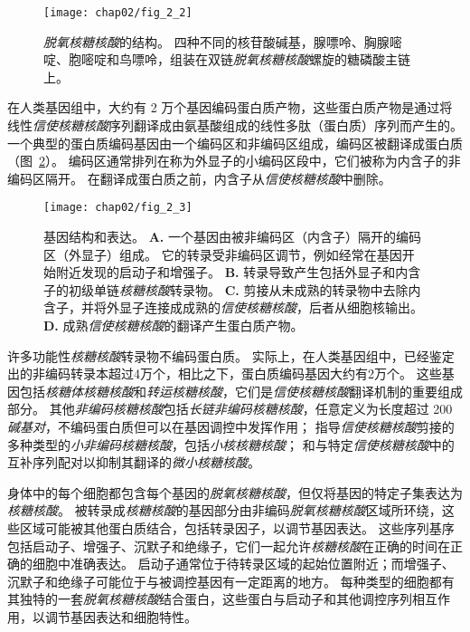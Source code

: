 \begin{figure}[htbp]
	\centering
	\texttt{[image: chap02/fig\_2\_2]}
	\caption{\textit{脱氧核糖核酸}的结构。
		四种不同的核苷酸碱基，腺嘌呤、胸腺嘧啶、胞嘧啶和鸟嘌呤，组装在双链\textit{脱氧核糖核酸}螺旋的糖磷酸主链上\cite{alberts2017molecular}。}
	\label{fig:2_2}
\end{figure}


在人类基因组中，大约有 2 万个基因编码蛋白质产物，这些蛋白质产物是通过将线性\textit{信使核糖核酸}序列翻译成由氨基酸组成的线性多肽（蛋白质）序列而产生的。
一个典型的蛋白质编码基因由一个编码区和非编码区组成，编码区被翻译成蛋白质（图~\ref{fig:2_3}）。
编码区通常排列在称为外显子的小编码区段中，它们被称为内含子的非编码区隔开。
在翻译成蛋白质之前，内含子从\textit{信使核糖核酸}中删除。



\begin{figure}[htbp]
	\centering
	\texttt{[image: chap02/fig\_2\_3]}
	\caption{基因结构和表达。
		\textbf{A.} 一个基因由被非编码区（内含子）隔开的编码区（外显子）组成。
		它的转录受非编码区调节，例如经常在基因开始附近发现的启动子和增强子。
		\textbf{B.} 转录导致产生包括外显子和内含子的初级单链\textit{核糖核酸}转录物。
		\textbf{C.} 剪接从未成熟的转录物中去除内含子，并将外显子连接成成熟的\textit{信使核糖核酸}，后者从细胞核输出。
		\textbf{D.} 成熟\textit{信使核糖核酸}的翻译产生蛋白质产物。}
	\label{fig:2_3}
\end{figure}


许多功能性\textit{核糖核酸}转录物不编码蛋白质。 
实际上，在人类基因组中，已经鉴定出的非编码转录本超过4万个，相比之下，蛋白质编码基因大约有2万个。
这些基因包括\textit{核糖体核糖核酸}和\textit{转运核糖核酸}，它们是\textit{信使核糖核酸}翻译机制的重要组成部分。
其他\textit{非编码核糖核酸}包括\textit{长链非编码核糖核酸}，任意定义为长度超过 200 \textit{碱基对}，不编码蛋白质但可以在基因调控中发挥作用；
指导\textit{信使核糖核酸}剪接的多种类型的\textit{小非编码核糖核酸}，包括\textit{小核核糖核酸}；
和与特定\textit{信使核糖核酸}中的互补序列配对以抑制其翻译的\textit{微小核糖核酸}。



身体中的每个细胞都包含每个基因的\textit{脱氧核糖核酸}，但仅将基因的特定子集表达为\textit{核糖核酸}。
被转录成\textit{核糖核酸}的基因部分由非编码\textit{脱氧核糖核酸}区域所环绕，这些区域可能被其他蛋白质结合，包括转录因子，以调节基因表达。
这些序列基序包括启动子、增强子、沉默子和绝缘子，它们一起允许\textit{核糖核酸}在正确的时间在正确的细胞中准确表达。
启动子通常位于待转录区域的起始位置附近；而增强子、沉默子和绝缘子可能位于与被调控基因有一定距离的地方。
每种类型的细胞都有其独特的一套\textit{脱氧核糖核酸}结合蛋白，这些蛋白与启动子和其他调控序列相互作用，以调节基因表达和细胞特性。




